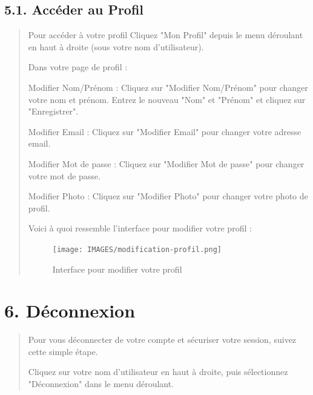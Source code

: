 \documentclass[a4paper,12pt]{article}
\begin{document}
\subsection*{5.1. Accéder au Profil}
\begin{quote}
Pour accéder à votre profil Cliquez "Mon Profil" depuis le menu déroulant en haut à droite (sous votre nom d'utilisateur).

Dans votre page de profil :

Modifier Nom/Prénom : Cliquez sur "Modifier Nom/Prénom" pour changer votre nom et prénom. Entrez le nouveau "Nom" et "Prénom" et cliquez sur "Enregistrer".

Modifier Email : Cliquez sur "Modifier Email" pour changer votre adresse email.

Modifier Mot de passe : Cliquez sur "Modifier Mot de passe" pour changer votre mot de passe.

Modifier Photo : Cliquez sur "Modifier Photo" pour changer votre photo de profil.

Voici à quoi ressemble l'interface pour modifier votre profil :

\begin{figure}[H]
\centering
\texttt{[image: IMAGES/modification-profil.png]}
\caption{Interface pour modifier votre profil}
\label{fig:modifprofil}
\end{figure}

\end{quote}

\section*{6. Déconnexion}
\begin{quote}
Pour vous déconnecter de votre compte et sécuriser votre session, suivez cette simple étape.

Cliquez sur votre nom d'utilisateur en haut à droite, puis sélectionnez "Déconnexion" dans le menu déroulant.
\end{quote}
\end{document}
